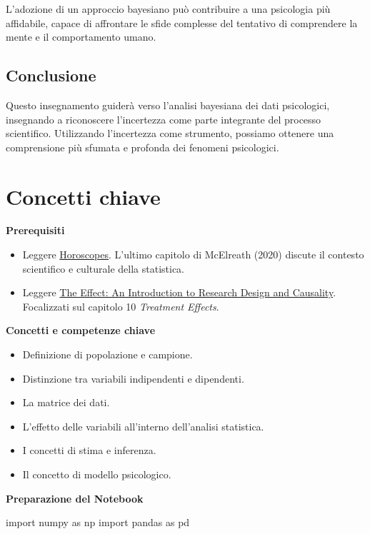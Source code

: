 \documentclass[
  letterpaper,
  krantz2]{{[}./krantz{]}}
\newenvironment{Shaded}{\begin{snugshade}}{\end{snugshade}}
\newcommand{\ImportTok}[1]{\textcolor[rgb]{0.00,0.46,0.62}{#1}}
\newcommand{\NormalTok}[1]{\textcolor[rgb]{0.00,0.23,0.31}{#1}}
\providecommand{\tightlist}{%
  \setlength{\itemsep}{0pt}\setlength{\parskip}{0pt}}\usepackage{longtable,booktabs,array}
\begin{document}
L'adozione di un approccio bayesiano può contribuire a una psicologia
più affidabile, capace di affrontare le sfide complesse del tentativo di
comprendere la mente e il comportamento umano.

\section{Conclusione}\label{conclusione}

Questo insegnamento guiderà verso l'analisi bayesiana dei dati
psicologici, insegnando a riconoscere l'incertezza come parte integrante
del processo scientifico. Utilizzando l'incertezza come strumento,
possiamo ottenere una comprensione più sfumata e profonda dei fenomeni
psicologici.

\chapter{Concetti chiave}\label{sec-key-notions}

\textbf{Prerequisiti}

\begin{itemize}
\tightlist
\item
  Leggere \href{../../figures/horoscopes.pdf}{Horoscopes}. L'ultimo
  capitolo di McElreath (2020) discute il contesto scientifico e
  culturale della statistica.
\item
  Leggere \href{https://theeffectbook.net}{The Effect: An Introduction
  to Research Design and Causality}. Focalizzati sul capitolo 10
  \emph{Treatment Effects}.
\end{itemize}

\textbf{Concetti e competenze chiave}

\begin{itemize}
\tightlist
\item
  Definizione di popolazione e campione.
\item
  Distinzione tra variabili indipendenti e dipendenti.
\item
  La matrice dei dati.
\item
  L'effetto delle variabili all'interno dell'analisi statistica.
\item
  I concetti di stima e inferenza.
\item
  Il concetto di modello psicologico.
\end{itemize}

\textbf{Preparazione del Notebook}

\begin{Shaded}
\begin{Highlighting}[]
\ImportTok{import}\NormalTok{ numpy }\ImportTok{as}\NormalTok{ np}
\ImportTok{import}\NormalTok{ pandas }\ImportTok{as}\NormalTok{ pd}
\end{Highlighting}
\end{Shaded}
\end{document}
